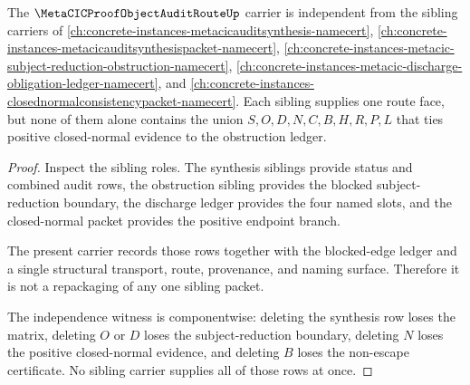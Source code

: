 \begin{theorem}
\label{thm:metacic-proof-object-audit-route-sibling-independence}
The $\MetaCICProofObjectAuditRouteUp$ carrier is independent from the sibling carriers of \autoref{ch:concrete-instances-metacicauditsynthesis-namecert}, \autoref{ch:concrete-instances-metacicauditsynthesispacket-namecert}, \autoref{ch:concrete-instances-metacic-subject-reduction-obstruction-namecert}, \autoref{ch:concrete-instances-metacic-discharge-obligation-ledger-namecert}, and \autoref{ch:concrete-instances-closednormalconsistencypacket-namecert}. Each sibling supplies one route face, but none of them alone contains the union $S,O,D,N,C,B,H,R,P,L$ that ties positive closed-normal evidence to the obstruction ledger.
\end{theorem}
\begin{proof}
Inspect the sibling roles. The synthesis siblings provide status and combined audit rows, the obstruction sibling provides the blocked subject-reduction boundary, the discharge ledger provides the four named slots, and the closed-normal packet provides the positive endpoint branch.

The present carrier records those rows together with the blocked-edge ledger and a single structural transport, route, provenance, and naming surface. Therefore it is not a repackaging of any one sibling packet.

The independence witness is componentwise: deleting the synthesis row loses the matrix, deleting $O$ or $D$ loses the subject-reduction boundary, deleting $N$ loses the positive closed-normal evidence, and deleting $B$ loses the non-escape certificate. No sibling carrier supplies all of those rows at once.
\end{proof}

